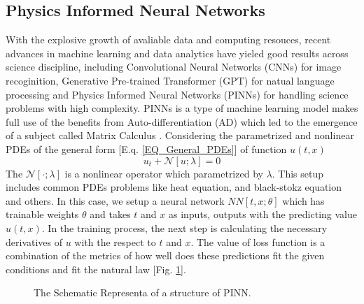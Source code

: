 \subsection{Physics Informed Neural Networks}
With the explosive growth of avaliable data and computing resouces, 
recent advances in machine learning and data analytics have yieled good results across science discipline, 
including Convolutional Neural Networks (CNNs) \cite{CNN}
for image recoginition, 
Generative Pre-trained Transformer (GPT) \cite{GPT}
for natual language processing and 
Physics Informed Neural Networks (PINNs) \cite{PINN}
for handling science problems with high complexity.
PINNs is a type of machine learning model makes full use of the benefits from 
Auto-differentiation (AD) \cite{AD}
which led to the emergence of a subject called 
Matrix Calculus \cite{Matrix_Calculus}.
Considering the parametrized and nonlinear PDEs of the general form [E.q. \ref{EQ_General_PDEs}] of function $u(t,x)$
\begin{equation}\label{EQ_General_PDEs}
  u_t + \mathcal{N}\left[u;\lambda\right] = 0
\end{equation}
The $\mathcal{N}[\cdot;\lambda]$ is a nonlinear operator which parametrized by $\lambda$.
This setup includes common PDEs problems like heat equation, and black-stokz equation and others.
In this case, we setup a neural network $NN[t,x;\theta]$ which has trainable weights $\theta$ and takes 
$t$ and $x$ as inputs, outputs with the predicting value $\hat{u}(t,x)$.
In the training process, the next step is calculating the necessary derivatives of $u$ with the respect to $t$ and $x$.
The value of loss function is a combination of the metrics of how well does these predictions fit the given conditions and 
fit the natural law [Fig. \ref{FIG_Schematic_View_PINN}]. 
\begin{figure}[htbp]
  \centering
  
  \caption{The Schematic Representa of a structure of PINN.}
  \label{FIG_Schematic_View_PINN}
\end{figure}